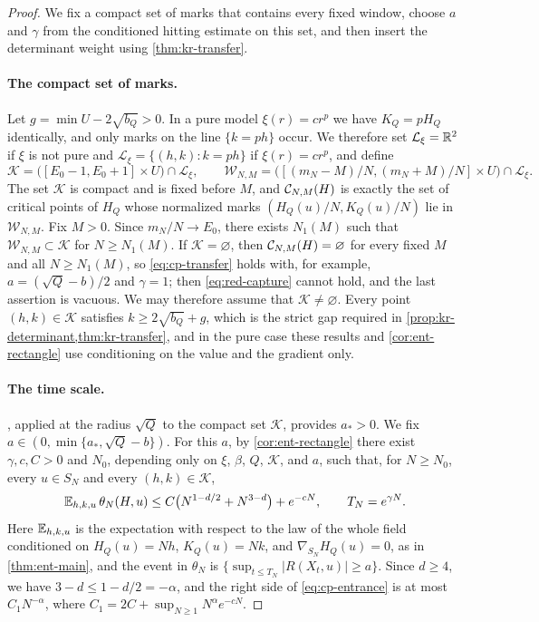 \begin{proof}
We fix a compact set of marks that contains every fixed window, choose $a$ and $\gamma$ from the conditioned hitting estimate on this set, and then insert the determinant weight using \cref{thm:kr-transfer}.

\paragraph{The compact set of marks.}
Let $g=\min U-2\sqrt{b_Q}>0$. In a pure model $\xi(r)=cr^p$ we have $K_Q=pH_Q$ identically, and only marks on the line $\{k=ph\}$ occur. We therefore set $\mathcal L_\xi=\mathbb R^2$ if $\xi$ is not pure and $\mathcal L_\xi=\{(h,k):k=ph\}$ if $\xi(r)=cr^p$, and define
\begin{equation*}
\mathcal K=\bigl([E_0-1,E_0+1]\times U\bigr)\cap\mathcal L_\xi,\qquad\mathcal W_{N,M}=\bigl([(m_N-M)/N,(m_N+M)/N]\times U\bigr)\cap\mathcal L_\xi.
\end{equation*}
The set $\mathcal K$ is compact and is fixed before $M$, and $\mathcal C_{N,M}(H)$ is exactly the set of critical points of $H_Q$ whose normalized marks $(H_Q(u)/N,K_Q(u)/N)$ lie in $\mathcal W_{N,M}$. Fix $M>0$. Since $m_N/N\to E_0$, there exists $N_1(M)$ such that $\mathcal W_{N,M}\subset\mathcal K$ for $N\ge N_1(M)$. If $\mathcal K=\varnothing$, then $\mathcal C_{N,M}(H)=\varnothing$ for every fixed $M$ and all $N\ge N_1(M)$, so \eqref{eq:cp-transfer} holds with, for example, $a=(\sqrt Q-b)/2$ and $\gamma=1$; then \eqref{eq:red-capture} cannot hold, and the last assertion is vacuous. We may therefore assume that $\mathcal K\ne\varnothing$. Every point $(h,k)\in\mathcal K$ satisfies $k\ge2\sqrt{b_Q}+g$, which is the strict gap required in \cref{prop:kr-determinant,thm:kr-transfer}, and in the pure case these results and \cref{cor:ent-rectangle} use conditioning on the value and the gradient only.

\paragraph{The time scale.}
, applied at the radius $\sqrt Q$ to the compact set $\mathcal K$, provides $a_*>0$. We fix $a\in(0,\min\{a_*,\sqrt Q-b\})$. For this $a$, by \cref{cor:ent-rectangle} there exist $\gamma,c,C>0$ and $N_0$, depending only on $\xi$, $\beta$, $Q$, $\mathcal K$, and $a$, such that, for $N\ge N_0$, every $u\in S_N$ and every $(h,k)\in\mathcal K$,
\begin{equation}\label{eq:cp-entrance}
\mathbb E_{h,k,u}\,\theta_N(H,u)\le C\bigl(N^{1-d/2}+N^{3-d}\bigr)+e^{-cN},\qquad T_N=e^{\gamma N}.
\end{equation}
Here $\mathbb E_{h,k,u}$ is the expectation with respect to the law of the whole field conditioned on $H_Q(u)=Nh$, $K_Q(u)=Nk$, and $\nabla_{S_N}H_Q(u)=0$, as in \cref{thm:ent-main}, and the event in $\theta_N$ is $\{\sup_{t\le T_N}|R(X_t,u)|\ge a\}$. Since $d\ge4$, we have $3-d\le1-d/2=-\alpha$, and the right side of \eqref{eq:cp-entrance} is at most $C_1N^{-\alpha}$, where $C_1=2C+\sup_{N\ge1}N^\alpha e^{-cN}$.


\end{proof}
